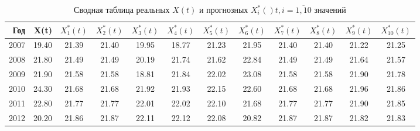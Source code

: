 \begin{table}[ht]
\centering
\caption{Сводная таблица реальных $ X(t)$ и прогнозных $ X_i^{*}()t, i = \overline{1,10} $ значений} 
\label{table:summary-prediction}
\begingroup\footnotesize
\begin{tabular}{r|rcccccccccc}
  \hline
Год & X(t) & $ X^{*}_1(t) $ & $ X^{*}_2(t) $ & $ X^{*}_3(t) $ & $ X^{*}_4(t) $ & $ X^{*}_5(t) $ & $ X^{*}_6(t) $ & $ X^{*}_7(t) $ & $ X^{*}_8(t) $ & $ X^{*}_9(t) $ & $ X^{*}_{10}(t) $ \\ 
  \hline
2007 & 19.40 & 21.39 & 21.40 & 19.95 & 18.77 & 21.23 & 21.95 & 21.40 & 21.40 & 21.22 & 21.25 \\ 
  2008 & 21.80 & 21.49 & 21.49 & 20.19 & 21.74 & 21.62 & 22.84 & 21.49 & 21.49 & 21.64 & 21.57 \\ 
  2009 & 21.90 & 21.58 & 21.58 & 18.81 & 21.84 & 22.02 & 23.08 & 21.58 & 21.58 & 21.90 & 21.78 \\ 
  2010 & 24.30 & 21.68 & 21.68 & 21.92 & 21.93 & 22.15 & 22.60 & 21.68 & 21.68 & 21.96 & 21.86 \\ 
  2011 & 22.80 & 21.77 & 21.77 & 22.01 & 22.02 & 22.10 & 21.68 & 21.77 & 21.77 & 21.90 & 21.85 \\ 
  2012 & 20.20 & 21.86 & 21.87 & 22.11 & 22.12 & 22.08 & 20.82 & 21.87 & 21.87 & 21.82 & 21.83 \\ 
   \hline
\end{tabular}
\endgroup
\end{table}

